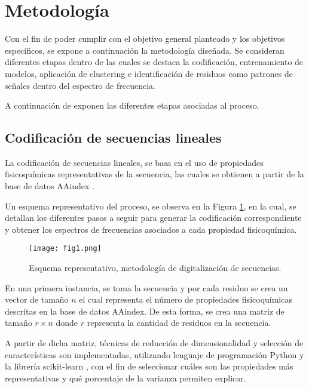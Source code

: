 \section{Metodología}

Con el fin de poder cumplir con el objetivo general planteado y los objetivos específicos, se expone a continuación la metodología diseñada. Se consideran diferentes etapas dentro de las cuales se destaca la codificación, entrenamiento de modelos, aplicación de clustering e identificación de residuos como patrones de señales dentro del espectro de frecuencia.

A continuación de exponen las diferentes etapas asociadas al proceso.

\subsection{Codificación de secuencias lineales}

La codificación de secuencias lineales, se basa en el uso de propiedades fisicoquímicas representativas de la secuencia, las cuales se obtienen a partir de la base de datos AAindex \cite{Kawashima2000}.

Un esquema representativo del proceso, se observa en la Figura \ref{cap3:fig1}, en la cual, se detallan los diferentes pasos a seguir para generar la codificación correspondiente y obtener los espectros de frecuencias asociados a cada propiedad fisicoquímica.

\begin{figure}[!h]
	
	\centering
	\texttt{[image: fig1.png]}
	\caption{Esquema representativo, metodología de digitalización de secuencias.}
	\label{cap3:fig1}
\end{figure}

En una primera instancia, se toma la secuencia y por cada residuo se crea un vector de tamaño $n$ el cual representa el número de propiedades fisicoquímicas descritas en la base de datos AAindex. De esta forma, se crea una matriz de tamaño $r \times n$ donde $r$ representa la cantidad de residuos en la secuencia.


A partir de dicha matriz, técnicas de reducción de dimensionalidad y selección de características son implementadas, utilizando lenguaje de programación Python y la librería scikit-learn \cite{pedregosa2011scikit}, con el fin de seleccionar cuáles son las propiedades más representativas y qué porcentaje de la varianza permiten explicar.

